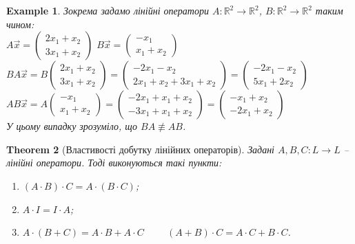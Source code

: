 \documentclass[a4paper, 10pt]{article}
\theoremstyle{theoremdd}
\newtheorem{theorem}{Theorem}[subsection]
\newtheorem{example}[theorem]{Example}
\begin{document}
	\begin{example}
	Зокрема задамо лінійні оператори $A \colon \mathbb{R}^2 \to \mathbb{R}^2$, $B \colon \mathbb{R}^2 \to \mathbb{R}^2$ таким чином:\\
	$A \vec{x} = \begin{pmatrix}
	2x_1 + x_2 \\ 3x_1 + x_2
	\end{pmatrix}$ \hspace{1cm} $B \vec{x} = \begin{pmatrix}
	-x_1 \\ x_1 + x_2
	\end{pmatrix}$\\
	$BA \vec{x} = B \begin{pmatrix}
	2x_1 + x_2 \\ 3x_1 + x_2
	\end{pmatrix} = \begin{pmatrix}
	-2x_1-x_2 \\ 2x_1+x_2+3x_1+x_2
	\end{pmatrix} = \begin{pmatrix}
	-2x_1-x_2 \\ 5x_1+2x_2
	\end{pmatrix}$\\
	$AB \vec{x} = A \begin{pmatrix}
	-x_1 \\ x_1 + x_2
	\end{pmatrix} = \begin{pmatrix}
	-2x_1 + x_1 + x_2 \\ -3x_1 + x_1 + x_2
	\end{pmatrix} = \begin{pmatrix}
	-x_1 + x_2 \\ -2x_1 + x_2
	\end{pmatrix}$\\
	У цьому випадку зрозуміло, що $BA \not\equiv AB$.
	\end{example}
	
	\begin{theorem}[Властивості добутку лінійних операторів]
	Задані $A,B,C \colon L \to L$ -- лінійні оператори. Тоді виконуються такі пункти:
	\begin{enumerate}[nosep, wide=0pt, label={\arabic*)}]
	\item $(A \cdot B) \cdot C = A \cdot (B \cdot C)$;
	\item $A \cdot I = I \cdot A$;
	\item $A \cdot (B+C) = A \cdot B + A \cdot C \hspace{1cm} (A+B) \cdot C = A \cdot C + B \cdot C$.
	\end{enumerate}
	\end{theorem}
	
\end{document}
